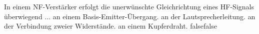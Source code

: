     {In einem NF-Verstärker erfolgt die unerwünschte Gleichrichtung eines HF-Signals überwiegend ...}
    {an einem Basis-Emitter-Übergang.}
    {an der Lautsprecherleitung.}
    {an der Verbindung zweier Widerstände.}
    {an einem Kupferdraht.}
    {false}{false}